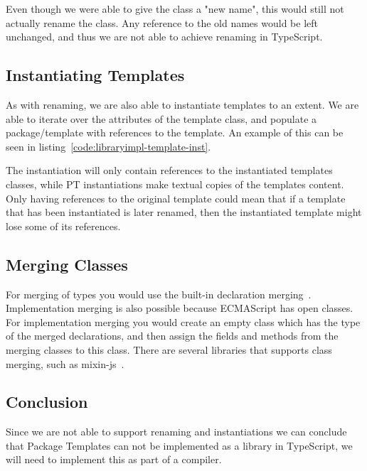 
Even though we were able to give the class a "new name", this would still not actually rename the class.
Any reference to the old names would be left unchanged, and thus we are not able to achieve renaming in TypeScript.

\subsection{Instantiating Templates}\label{subsec:instantiating-templates}

As with renaming, we are also able to instantiate templates to an extent.
We are able to iterate over the attributes of the template class, and populate a package/template with references to the template.
An example of this can be seen in listing~\vref{code:libraryimpl-template-inst}.


The instantiation will only contain references to the instantiated templates classes, while PT instantiations make textual copies of the templates content.
Only having references to the original template could mean that if a template that has been instantiated is later renamed, then the instantiated template might lose some of its references.


\subsection{Merging Classes}\label{subsec:merging-classes}

For merging of types you would use the built-in declaration merging~\cite{declerationmerging}.
Implementation merging is also possible because ECMAScript has open classes. 
For implementation merging you would create an empty class which has the type of the merged declarations, and then assign the fields and methods from the merging classes to this class.
There are several libraries that supports class merging, such as mixin-js~\cite{mixinjs}.

\subsection{Conclusion}

Since we are not able to support renaming and instantiations we can conclude that Package Templates can not be implemented as a library in TypeScript, we will need to implement this as part of a compiler.




